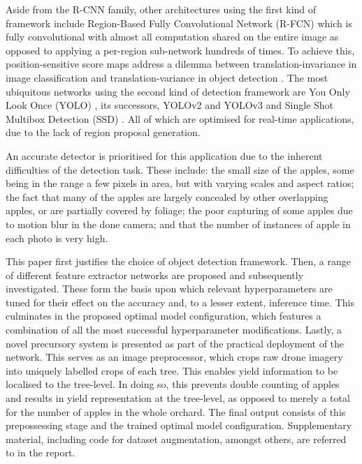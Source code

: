 \documentclass[journal]{IEEEtran}
\begin{document}
Aside from the R-CNN family, other architectures using the first kind of framework include Region-Based Fully Convolutional Network (R-FCN) which is fully convolutional with almost all computation shared on the entire image as opposed to applying a per-region sub-network hundreds of times. To achieve this, position-sensitive score maps address a dilemma between translation-invariance in image classification and translation-variance in object detection \cite{rfcn}. 
The most ubiquitous networks using the second kind of detection framework are You Only Look Once (YOLO) \cite{yolo}, its successors, YOLOv2 and YOLOv3 \cite{yolov2,yolov3NEW} and Single Shot Multibox Detection (SSD) \cite{ssd}. All of which are optimised for real-time applications, due to the lack of region proposal generation.


An accurate detector is prioritised for this application due to the inherent difficulties of the detection task. These include: the small size of the apples, some being in the range a few pixels in area, but with varying scales and aspect ratios; the fact that many of the apples are largely concealed by other overlapping apples, or are partially covered by foliage; the poor capturing of some apples due to motion blur in the done camera; and that the number of instances of apple in each photo is very high.

This paper first justifies the choice of object detection framework. Then, a range of different feature extractor networks are proposed and subsequently investigated. These form the basis upon which relevant hyperparameters are tuned for their effect on the accuracy
and, to a lesser extent, inference time. This culminates in the proposed optimal model configuration, which features a combination of all the most successful hyperparameter modifications. 
Lastly, a novel precursory system is presented as part of the practical deployment of the network. This serves as an image preprocessor, which crops raw drone imagery into uniquely labelled crops of each tree. This enables yield information to be localised to the tree-level. In doing so, this prevents double counting of apples and results in yield representation at the tree-level, as opposed to merely a total for the number of apples in the whole orchard.
The final output consists of this prepossessing stage and the trained optimal model configuration. Supplementary material, including code for dataset augmentation, amongst others, are referred to in the report.
\end{document}
